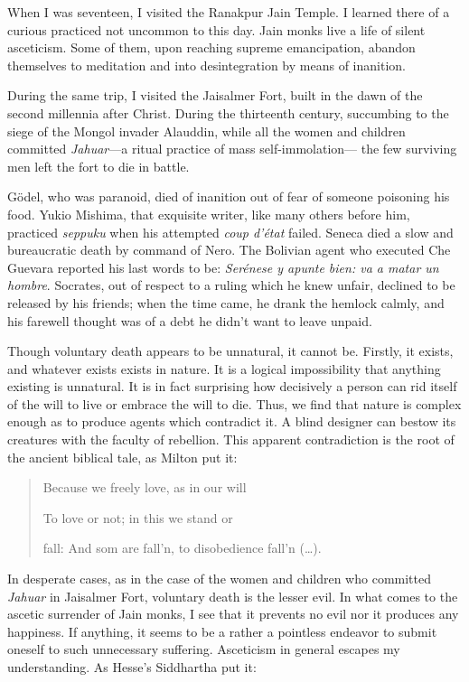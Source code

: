 \documentclass[a4paper, 12pt]{article}
\begin{document}
When I was seventeen, I visited the Ranakpur Jain Temple. I learned there of a
curious practiced not uncommon to this day. Jain monks live a life of silent
asceticism. Some of them, upon reaching supreme emancipation, abandon
themselves to meditation and into desintegration by means of inanition. 

During the same trip, I visited the Jaisalmer Fort, built in the dawn of the
second millennia after Christ. During the thirteenth century, succumbing to the
siege of the Mongol invader Alauddin, while all the women and children
committed \textit{Jahuar}---a ritual practice of mass self-immolation--- the
few surviving men left the fort to die in battle.


Gödel, who was paranoid, died of
inanition out of fear of someone poisoning his food. Yukio Mishima, that
exquisite writer, like many others before him, practiced \textit{seppuku} when
his attempted \textit{coup d'état} failed. Seneca died a slow and bureaucratic
death by command of Nero. The Bolivian agent who executed Che Guevara reported
his last words to be: \textit{Serénese y apunte bien: va a matar un hombre}.
Socrates, out of respect to a ruling which he knew unfair, declined to be
released by his friends; when the time came, he drank the hemlock calmly, and
his farewell thought was of a debt he didn't want to leave unpaid. 

Though voluntary death appears to  be unnatural, it cannot be. Firstly, it
exists, and whatever exists exists in nature. It is a logical impossibility
that anything existing is unnatural. It is in fact surprising how decisively a
person can rid itself of the will to live or embrace the will to die. Thus, we
find that nature is complex enough as to produce agents which contradict it. A
blind designer can bestow its creatures with the faculty of rebellion. This
apparent contradiction is the root of the ancient biblical tale, as Milton put
it:

\begin{quote}
    Because we freely love, as in our will 

    To love or not; in this we stand or
    
    fall: And som are fall’n, to disobedience fall’n (\ldots).
\end{quote}

In desperate cases, as in the case of the women and children who committed
\textit{Jahuar} in Jaisalmer Fort, voluntary death is the lesser evil. In what
comes to the ascetic surrender of Jain monks, I see that it prevents no evil
nor it produces any happiness. If anything, it seems to be a rather a pointless 
endeavor to submit oneself to such unnecessary suffering. Asceticism in general 
escapes my understanding. As Hesse's Siddhartha put it:
\end{document}
